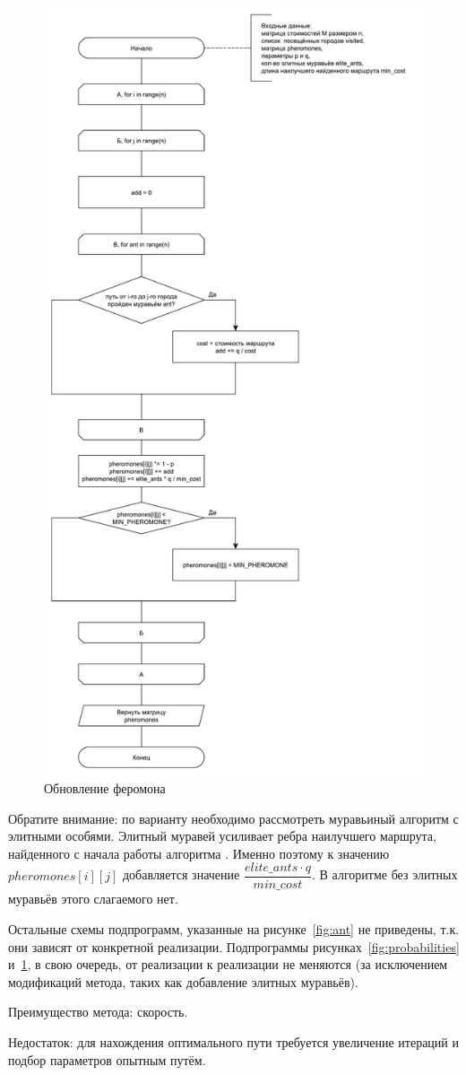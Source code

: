 \begin{figure}
	\centering
	\includegraphics[width=0.65\linewidth]{images/pheromone}
	\caption{Обновление феромона}
	\label{fig:pheromone}
\end{figure}

Обратите внимание: по варианту необходимо рассмотреть муравьиный алгоритм с элитными особями.
Элитный муравей усиливает ребра наилучшего маршрута, найденного с начала работы алгоритма \cite{штовба2003муравьиные}.
Именно поэтому к значению $pheromones[i][j]$ добавляется значение $\dfrac{elite\_ants \cdot q}{ min\_cost}$.
В алгоритме без элитных муравьёв этого слагаемого нет.

Остальные схемы подпрограмм, указанные на рисунке~\ref{fig:ant} не приведены, т.к. они зависят от конкретной реализации.
Подпрограммы рисунках~\ref{fig:probabilities} и~\ref{fig:pheromone}, в свою очередь, от реализации к реализации не меняются (за исключением модификаций метода, таких как добавление элитных муравьёв).

Преимущество метода: скорость.

Недостаток: для нахождения оптимального пути требуется увеличение итераций и подбор параметров опытным путём.